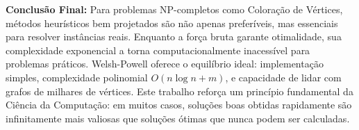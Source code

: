 \documentclass[12pt]{article}
\begin{document}
\vspace{0.3cm}

\textbf{Conclusão Final:} Para problemas NP-completos como Coloração de Vértices, métodos heurísticos bem projetados são não apenas preferíveis, mas essenciais para resolver instâncias reais. Enquanto a força bruta garante otimalidade, sua complexidade exponencial a torna computacionalmente inacessível para problemas práticos. Welsh-Powell oferece o equilíbrio ideal: implementação simples, complexidade polinomial $O(n \log n + m)$, e capacidade de lidar com grafos de milhares de vértices. Este trabalho reforça um princípio fundamental da Ciência da Computação: em muitos casos, soluções boas obtidas rapidamente são infinitamente mais valiosas que soluções ótimas que nunca podem ser calculadas.
\newpage


\end{document}
